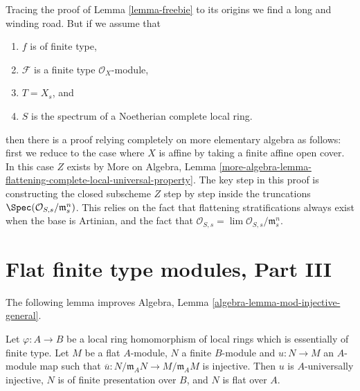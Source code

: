 \begin{remark}
\label{remark-flattening-complete-noetherian}
Tracing the proof of
Lemma \ref{lemma-freebie}
to its origins we find a long and winding road. But if we assume that
\begin{enumerate}
\item $f$ is of finite type,
\item $\mathcal{F}$ is a finite type $\mathcal{O}_X$-module,
\item $T = X_s$, and
\item $S$ is the spectrum of a Noetherian complete local ring.
\end{enumerate}
then there is a proof relying completely on more elementary algebra as
follows: first we reduce to the case where $X$ is affine by taking
a finite affine open cover. In this case $Z$ exists by
More on Algebra,
Lemma \ref{more-algebra-lemma-flattening-complete-local-universal-property}.
The key step in this proof is constructing the closed subscheme $Z$
step by step inside the truncations
$\Spec(\mathcal{O}_{S, s}/\mathfrak m_s^n)$.
This relies on the fact that flattening stratifications always exist
when the base is Artinian, and the fact that
$\mathcal{O}_{S, s} = \lim \mathcal{O}_{S, s}/\mathfrak m_s^n$.
\end{remark}




\section{Flat finite type modules, Part III}
\label{section-finite-type-flat-III}

\noindent
The following lemma improves
Algebra, Lemma \ref{algebra-lemma-mod-injective-general}.

\begin{lemma}
\label{lemma-finite-type-injective-into-flat-mod-m}
Let $\varphi : A \to B$ be a local ring homomorphism of local rings
which is essentially of finite type. Let $M$ be a flat $A$-module,
$N$ a finite $B$-module and $u : N \to M$ an $A$-module map such that
$\overline{u} : N/\mathfrak m_AN \to M/\mathfrak m_AM$ is injective.
Then $u$ is $A$-universally injective, $N$ is of finite presentation over
$B$, and $N$ is flat over $A$.
\end{lemma}

